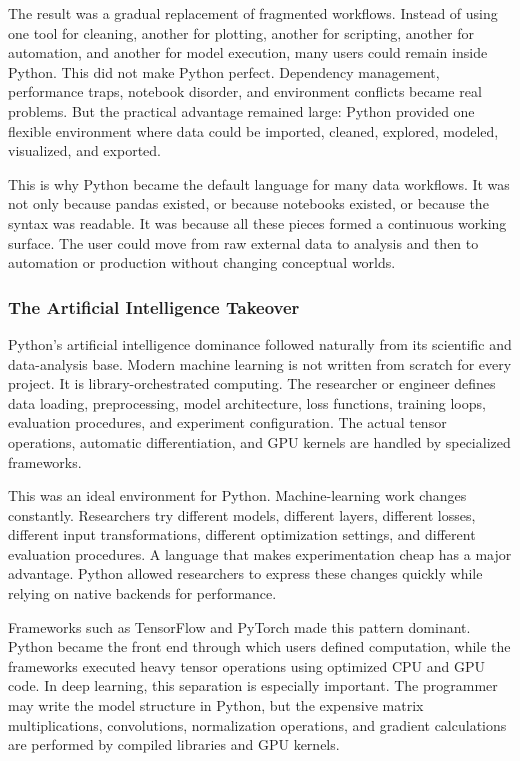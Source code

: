 The result was a gradual replacement of fragmented workflows. Instead of using one tool for cleaning, another for plotting, another for scripting, another for automation, and another for model execution, many users could remain inside Python. This did not make Python perfect. Dependency management, performance traps, notebook disorder, and environment conflicts became real problems. But the practical advantage remained large: Python provided one flexible environment where data could be imported, cleaned, explored, modeled, visualized, and exported.

This is why Python became the default language for many data workflows. It was not only because pandas existed, or because notebooks existed, or because the syntax was readable. It was because all these pieces formed a continuous working surface. The user could move from raw external data to analysis and then to automation or production without changing conceptual worlds.

\subsubsection{The Artificial Intelligence Takeover}

Python's artificial intelligence dominance followed naturally from its scientific and data-analysis base. Modern machine learning is not written from scratch for every project. It is library-orchestrated computing. The researcher or engineer defines data loading, preprocessing, model architecture, loss functions, training loops, evaluation procedures, and experiment configuration. The actual tensor operations, automatic differentiation, and GPU kernels are handled by specialized frameworks.

This was an ideal environment for Python. Machine-learning work changes constantly. Researchers try different models, different layers, different losses, different input transformations, different optimization settings, and different evaluation procedures. A language that makes experimentation cheap has a major advantage. Python allowed researchers to express these changes quickly while relying on native backends for performance.

Frameworks such as TensorFlow and PyTorch made this pattern dominant. Python became the front end through which users defined computation, while the frameworks executed heavy tensor operations using optimized CPU and GPU code. In deep learning, this separation is especially important. The programmer may write the model structure in Python, but the expensive matrix multiplications, convolutions, normalization operations, and gradient calculations are performed by compiled libraries and GPU kernels.

